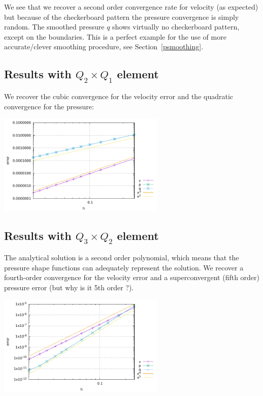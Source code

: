 We see that we recover a second order convergence rate for velocity (as expected) 
but because of the checkerboard pattern the pressure convergence is simply random. 
The smoothed pressure $q$ shows virtually no checkerboard pattern, except on the boundaries.
This is a perfect example for the use of more accurate/clever smoothing procedure, see
Section~\ref{psmoothing}.


\subsection*{Results with $Q_2\times Q_1$ element}

We recover the cubic convergence for the velocity error and the quadratic convergence 
for the pressure:

\begin{center}
\includegraphics[width=8cm]{python_codes/fieldstone_48/images/errors2.pdf}
\end{center}

\subsection*{Results with $Q_3\times Q_2$ element}

The analytical solution is a second order polynomial, which means that the pressure 
shape functions can adequately represent the solution. We recover a fourth-order 
convergence for the velocity error and a superconvergent (fifth order) pressure error 
(but why is it 5th order ?).

\begin{center}
\includegraphics[width=8cm]{python_codes/fieldstone_48/images/errors3.pdf}
\end{center}

